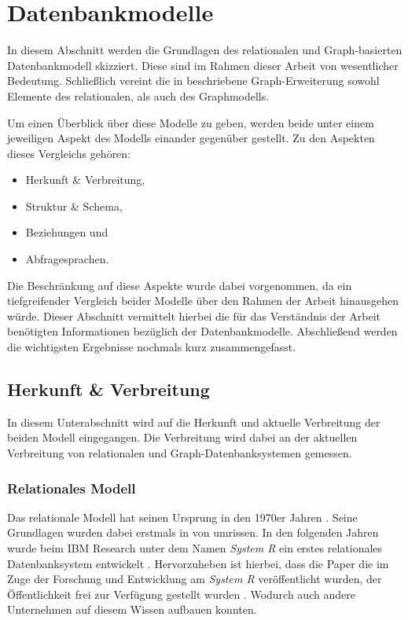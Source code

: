 \section{Datenbankmodelle}
\label{datenmodelle}
In diesem Abschnitt werden die Grundlagen des relationalen und Graph-basierten Datenbankmodell skizziert. Diese sind im Rahmen dieser Arbeit von wesentlicher Bedeutung. Schließlich vereint die in  beschriebene Graph-Erweiterung sowohl Elemente des relationalen, als auch des Graphmodells.

Um einen Überblick über diese Modelle zu geben, werden beide unter einem jeweiligen Aspekt des Modells einander gegenüber gestellt. Zu den Aspekten dieses Vergleichs gehören: 

\begin{itemize}
    \item Herkunft \& Verbreitung,
    \item Struktur \& Schema,
    \item Beziehungen und
    \item Abfragesprachen.
\end{itemize}

Die Beschränkung auf diese Aspekte wurde dabei vorgenommen, da ein tiefgreifender Vergleich beider Modelle über den Rahmen der Arbeit hinausgehen würde. Dieser Abschnitt vermittelt hierbei die für das Verständnis der Arbeit benötigten Informationen bezüglich der Datenbankmodelle. Abschließend werden die wichtigsten Ergebnisse nochmals kurz zusammengefasst.  

\subsection{Herkunft \& Verbreitung}
In diesem Unterabschnitt wird auf die Herkunft und aktuelle Verbreitung der beiden Modell eingegangen. Die Verbreitung wird dabei an der aktuellen Verbreitung von relationalen und Graph-Datenbanksystemen gemessen. 

\subsubsection{Relationales Modell}
Das relationale Modell hat seinen Ursprung in den 1970er Jahren \cite{rdbms_history}. Seine Grundlagen wurden dabei erstmals in \cite{codd_relational_model} von \citeauthor{codd_relational_model} umrissen. In den folgenden Jahren  wurde beim IBM Research unter dem Namen \textit{System R} ein erstes relationales Datenbanksystem entwickelt \cite{rdbms_history}. Hervorzuheben ist hierbei, dass die Paper die im Zuge der Forschung und Entwicklung am \textit{System R} veröffentlicht wurden, der Öffentlichkeit frei zur Verfügung gestellt wurden \cite{rdbms_history}. Wodurch auch andere Unternehmen auf diesem Wissen aufbauen konnten.

